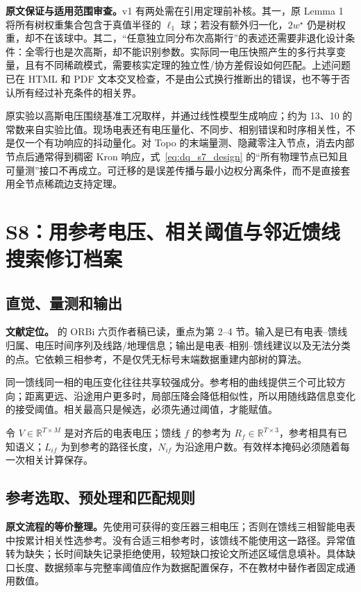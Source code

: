 \documentclass[UTF8,11pt,fontset=fandol,openany,oneside]{ctexbook}
\newcommand{\R}{\mathbb{R}}
\theoremstyle{definition}
\theoremstyle{remark}
\numberwithin{equation}{chapter}
\begin{document}
\textbf{原文保证与适用范围审查。}v1 有两处需在引用定理前补核。其一，原 Lemma 1 将所有树权重集合包含于真值半径的 $\ell_1$ 球；若没有额外归一化，$2w^\star$ 仍是树权重，却不在该球中。其二，“任意独立同分布次高斯行”的表述还需要非退化设计条件：全零行也是次高斯，却不能识别参数。实际同一电压快照产生的多行共享变量，且有不同稀疏模式，需要核实定理的独立性/协方差假设如何匹配。上述问题已在 HTML 和 PDF 文本交叉检查，不是由公式换行推断出的错误，也不等于否认所有经过补充条件的相关界。

原实验以高斯电压围绕基准工况取样，并通过线性模型生成响应；约为 13、10 的常数来自实验比值。现场电表还有电压量化、不同步、相别错误和时序相关性，不是仅一个有功响应的抖动量化。对 Topo 的末端量测、隐藏零注入节点，消去内部节点后通常得到稠密 Kron 响应，式~\eqref{eq:dq_s7_design} 的“所有物理节点已知且可量测”接口不再成立。可迁移的是误差传播与最小边权分离条件，而不是直接套用全节点稀疏边支持定理。

\section{S8：用参考电压、相关阈值与邻近馈线搜索修订档案}
\label{sec:dq_s8}

\subsection{直觉、量测和输出}

\textbf{文献定位。}\citet{S8} 的 ORBi 六页作者稿已读，重点为第 2--4 节。输入是已有电表--馈线归属、电压时间序列及线路/地理信息；输出是电表--相别--馈线建议以及无法分类的点。它依赖三相参考，不是仅凭无标号末端数据重建内部树的算法。

同一馈线同一相的电压变化往往共享较强成分。参考相的曲线提供三个可比较方向；距离更远、沿途用户更多时，局部压降会降低相似性，所以用随线路信息变化的接受阈值。相关最高只是候选，必须先通过阈值，才能赋值。

令 $V\in\R^{T\times M}$ 是对齐后的电表电压；馈线 $f$ 的参考为
$R_f\in\R^{T\times3}$，参考相具有已知语义；$L_{if}$ 为到参考的路径长度，$N_{if}$ 为沿途用户数。有效样本掩码必须随着每一次相关计算保存。

\subsection{参考选取、预处理和匹配规则}

\textbf{原文流程的等价整理。}先使用可获得的变压器三相电压；否则在馈线三相智能电表中按累计相关性选参考。没有合适三相参考时，该馈线不能使用这一路径。异常值转为缺失；长时间缺失记录拒绝使用，较短缺口按论文所述区域信息填补。具体缺口长度、数据频率与完整率阈值应作为数据配置保存，不在教材中替作者固定成通用数值。
\end{document}
